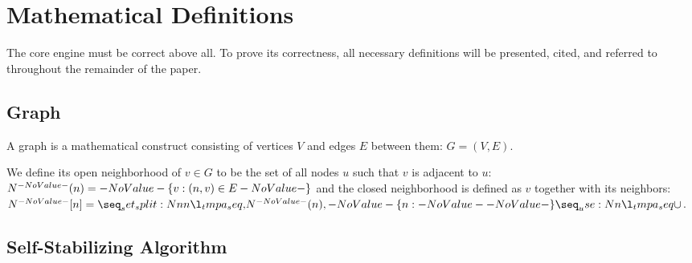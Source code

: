 \section{Mathematical Definitions}
\label{sec:math-defin}

The core engine must be correct above all.
To prove its correctness, all necessary definitions will be
  presented, cited, and referred to throughout the remainder of the paper.

\subsection{Graph}
\label{sec:math-defin:graphs}

A graph is a mathematical construct
  consisting of vertices $V$ and edges $E$ between them: $G = (V, E)$.

We define its open neighborhood of $v \in G$ to be
  the set of all nodes $u$ such that $v$ is adjacent to $u$:
  $\OpenNeighborhood{n} = \Set{v}[(n, v) \in E]$
  and the closed neighborhood is defined as $v$ together with its neighbors:
  $\ClosedNeighborhood{n} = \Union{\OpenNeighborhood{n}, \Set{n}}$.

\begin{comment}
\subsection{Finite State Machine}
\label{sec:math-define:fsm}

A finite state machine (\textsc{fsm})
  \todo{use acro package}
  \todo{may not even \emph{need} this section}
  is a mathematical model of computation
  described by an alphabet $\Sigma$,
  a finite number of states $Q$,
  an initial state $q_0 \in Q$,
  a set of accept states $F \subseteq Q$,
  and a transition function $\Function[\delta]{Q \cross \Sigma}{Q}$ between those states.
Thus, a fsm is defined by the five-tuple %
  \[ M = (\Sigma, Q, q_0, F, \delta). \]
These can be represented as graphs where nodes are states in $Q$ and
  transitions are directed edges between them.
\todo[cite]{finite state machine}
\end{comment}

\subsection{Self-Stabilizing Algorithm}
\label{sec:math-define:self-stab-algor}

